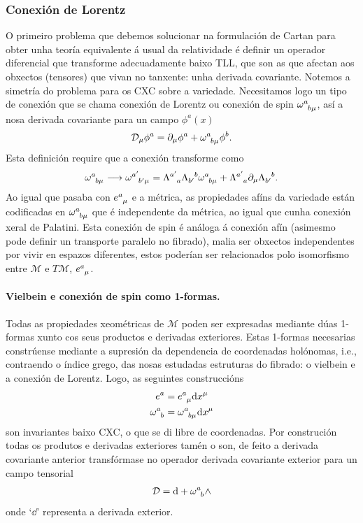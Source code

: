 \subsubsection{Conexión de Lorentz}
O primeiro problema que debemos solucionar na formulación de Cartan para obter unha teoría equivalente á usual da relatividade é definir un operador diferencial que transforme adecuadamente baixo TLL, que son as que afectan aos obxectos (tensores) que vivan no tanxente: unha derivada covariante. Notemos a simetría do problema para os CXC sobre a variedade. Necesitamos logo un tipo de conexión que se chama conexión de Lorentz ou conexión de spin $\omega\indices{^a_b_\mu}$, así a nosa derivada covariante para un campo $\phi^a(x)$ 
\begin{align}
    \mathcal{D}_\mu \phi^a = \partial_\mu\phi^a + \omega\indices{^a_b_\mu}\phi^b.
\end{align}
Esta definición require que a conexión transforme como
\begin{align}
    \omega\indices{^a_b_\mu}\longrightarrow \omega\indices{^{a'}_{b'}_\mu} = \Lambda\indices{^{a'}_a}\Lambda\indices{_{b'}^b} \omega\indices{^a_b_\mu} + \Lambda\indices{^{a'}_a}\partial_\mu\Lambda\indices{_{b'}^b}.
\end{align}
Ao igual que pasaba con $\viel$ e a métrica, as propiedades afíns da variedade están codificadas en $\omega\indices{^a_b_\mu}$ que é independente da métrica, ao igual que cunha conexión xeral de Palatini. Esta conexión de spin é análoga á conexión afín (asimesmo pode definir un transporte paralelo no fibrado), malia ser obxectos independentes por vivir en espazos diferentes, estos poderían ser relacionados polo isomorfismo entre $\mathcal{M}$ e $T\mathcal{M}$, $\viel$.

\paragraph{Vielbein e conexión de spin como 1-formas.}
Todas as propiedades xeométricas de $\mathcal{M}$ poden ser expresadas mediante dúas 1-formas xunto cos seus productos e derivadas exteriores. 
Estas 1-formas necesarias constrúense mediante a supresión da dependencia de coordenadas holónomas, i.e., contraendo o índice grego, das nosas estudadas estruturas do fibrado: o vielbein e a conexión de Lorentz. Logo, as seguintes construccións
\begin{align}
    e^a&=\viel\dd x^\mu\\
    \omega\indices{^a_b} &=\omega\indices{^a_b_\mu}\dd x^\mu 
\end{align}
son invariantes baixo CXC, o que se di libre de coordenadas. Por construción todas os produtos e derivadas exteriores tamén o son, de feito a derivada covariante anterior transfórmase no operador derivada covariante exterior para un campo tensorial
\begin{align}
    \mathcal{D} = \dd +\omega\indices{^a_b}\wedge
\end{align}
onde `$\dd$' representa a derivada exterior.
